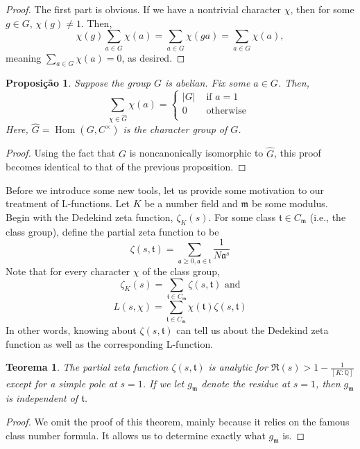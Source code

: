 \documentclass{article}
\DeclareMathOperator{\Hom}{Hom}
\newcommand{\QQ}{\mathbb{Q}}
\theoremstyle{plain}
\newtheorem{thm}{Teorema}
\newtheorem{prop}{Proposição}
\theoremstyle{remark}
\numberwithin{equation}{section}
\numberwithin{thm}{section}
\numberwithin{defn}{section}
\numberwithin{lemma}{section}
\numberwithin{axm}{section}
\begin{document}
\begin{proof}
The first part is obvious. If we have a nontrivial character $\chi$, then for some $g \in G$, $\chi(g) \neq 1$. Then, $$\chi(g)\sum_{a \in G} \chi(a) = \sum_{a \in G} \chi(ga) = \sum_{a \in G} \chi(a),$$ meaning $\sum_{a \in G} \chi(a) = 0$, as desired. 
\end{proof}

\begin{prop} \label{3.3}
Suppose the group $G$ is abelian. Fix some $a \in G$. Then, $$\sum_{\chi \in \hat{G}} \chi(a) = \begin{cases}
|G| & \text{ if } a = 1 \\
0 & \text { otherwise } \\
\end{cases}$$ Here, $\hat{G} = \Hom(G, C^{\times})$ is the character group of $G$. 
\end{prop}

\begin{proof}
Using the fact that $G$ is noncanonically isomorphic to $\hat{G}$, this proof becomes identical to that of the previous proposition. 
\end{proof}

Before we introduce some new tools, let us provide some motivation to our treatment of L-functions. Let $K$ be a number field and $\mathfrak{m}$ be some modulus. Begin with the Dedekind zeta function, $\zeta_{K}(s)$. For some class $\mathfrak{t} \in C_{\mathfrak{m}}$ (i.e., the class group), define the partial zeta function to be $$\zeta(s, \mathfrak{t}) = \sum_{\mathfrak{a} \ge 0, \mathfrak{a} \in \mathfrak{t}} \frac{1}{N\mathfrak{a}^s}$$ Note that for every character $\chi$ of the class group, $$\zeta_{K}(s) = \sum_{\mathfrak{t} \in C_{\mathfrak{m}}} \zeta(s, \mathfrak{t}) \text{ and}$$ $$L(s, \chi) = \sum_{\mathfrak{t} \in C_{\mathfrak{m}}} \chi(\mathfrak{t})\zeta(s, \mathfrak{t})$$ In other words, knowing about $\zeta(s, \mathfrak{t})$ can tell us about the Dedekind zeta function as well as the corresponding L-function. 

\begin{thm}
The partial zeta function $\zeta(s, \mathfrak{t})$ is analytic for $\Re(s) > 1 - \frac{1}{[K : \QQ]}$ except for a simple pole at $s = 1$. If we let $g_{\mathfrak{m}}$ denote the residue at $s = 1$, then $g_{\mathfrak{m}}$ is independent of $\mathfrak{t}$.
\end{thm}

\begin{proof}
We omit the proof of this theorem, mainly because it relies on the famous class number formula. It allows us to determine exactly what $g_{\mathfrak{m}}$ is. 
\end{proof}
\end{document}
